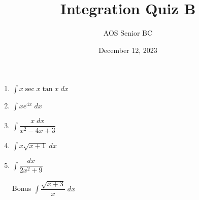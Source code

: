 \documentclass{article}
\begin{document}
\title{Integration Quiz B}
\date{December 12, 2023}
\author{AOS Senior BC}
\maketitle
\begin{enumerate}
	\setlength{\itemsep}{2in}
	\item $\displaystyle \int x \sec x \tan x \; dx$
	\item $\displaystyle \int x e^{4x} \; dx$
	\item $\displaystyle \int \dfrac{x \; dx}{x^2-4x+3}$
	\item $\displaystyle \int x \sqrt{x+1} \; dx$
	\item $\displaystyle \int \dfrac{dx}{2x^2+9}$
	\item[Bonus] $\displaystyle \int \dfrac{\sqrt{x+3}}{x} \; dx$
\end{enumerate}
\end{document}
